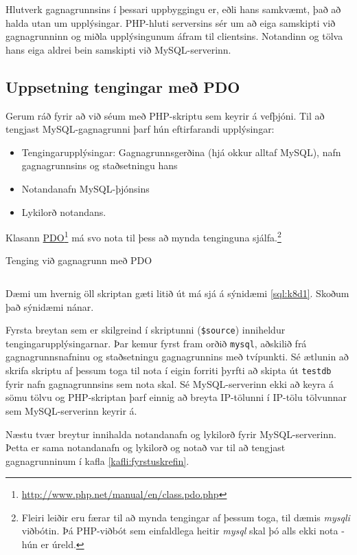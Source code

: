 Hlutverk gagnagrunnsins í þessari uppbyggingu er, eðli hans samkvæmt, það að halda utan um upplýsingar. PHP-hluti serversins sér um að eiga samskipti við gagnagrunninn og miðla upplýsingunum áfram til clientsins. Notandinn og tölva hans eiga aldrei bein samskipti við MySQL-serverinn.

\subsection{Uppsetning tengingar með PDO}
Gerum ráð fyrir að við séum með PHP-skriptu sem keyrir á vefþjóni. Til að tengjast MySQL-gagnagrunni þarf hún eftirfarandi upplýsingar:
\begin{itemize}
 \item Tengingarupplýsingar: Gagnagrunnsgerðina (hjá okkur alltaf MySQL), nafn gagnagrunnsins og staðsetningu hans
 \item Notandanafn MySQL-þjónsins
 \item Lykilorð notandans.
\end{itemize}
Klasann \href{http://www.php.net/manual/en/class.pdo.php}{PDO}\footnote{\url{http://www.php.net/manual/en/class.pdo.php}} má svo nota til þess að mynda tenginguna sjálfa.\footnote{Fleiri leiðir eru færar til að mynda tengingar af þessum toga, til dæmis \emph{mysqli} viðbótin. Þá PHP-viðbót sem einfaldlega heitir \emph{mysql} skal þó alls ekki nota - hún er úreld.}

\begin{example}[h]
\caption{Tenging við gagnagrunn með PDO}
\label{sql:k8d1}
\centering
\inputminted[frame=lines, fontfamily=courier]{php}{php/k8d1.php}
\end{example}

Dæmi um hvernig öll skriptan gæti litið út má sjá á sýnidæmi \ref{sql:k8d1}. Skoðum það sýnidæmi nánar. 

Fyrsta breytan sem er skilgreind í skriptunni (\verb|$source|) inniheldur tengingarupplýsingarnar. Þar kemur fyrst fram orðið \verb|mysql|, aðskilið frá gagnagrunnsnafninu og staðsetningu gagnagrunnins með tvípunkti. Sé ætlunin að skrifa skriptu af þessum toga til nota í eigin forriti þyrfti að skipta út \verb|testdb| fyrir nafn gagnagrunnsins sem nota skal. Sé MySQL-serverinn ekki að keyra á sömu tölvu og PHP-skriptan þarf einnig að breyta IP-tölunni í IP-tölu tölvunnar sem MySQL-serverinn keyrir á.

Næstu tvær breytur innihalda notandanafn og lykilorð fyrir MySQL-serverinn. Þetta er sama notandanafn og lykilorð og notað var til að tengjast gagnagrunninum í kafla \ref{kafli:fyrstuskrefin}.

